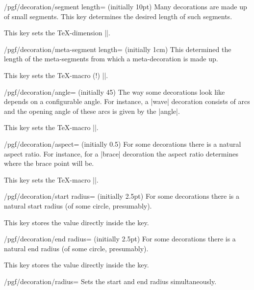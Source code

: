 \begin{key}{/pgf/decoration/segment length= (initially 10pt)}
  Many decorations are made up of small segments. This key determines
  the desired length of such segments.

  This key sets the \TeX-dimension |\pgfdecorationsegmentlength|.
\end{key}

\begin{key}{/pgf/decoration/meta-segment length= (initially 1cm)}
  This determined the length of the meta-segments from which a
  meta-decoration is made up.

  This key sets the \TeX-macro (!) |\pgfmetadecorationsegmentlength|.
\end{key}

\begin{key}{/pgf/decoration/angle= (initially 45)}
  The way some decorations look like depends on a configurable angle. For
  instance, a |wave| decoration consists of arcs and the opening angle
  of these arcs is given by the |angle|.

  This key sets the \TeX-macro |\pgfdecorationsegmentangle|.
\end{key}

\begin{key}{/pgf/decoration/aspect= (initially 0.5)}
  For some decorations there is a natural aspect ratio. For instance,
  for a |brace| decoration the aspect ratio determines where the brace
  point will be.

  This key sets the \TeX-macro |\pgfdecorationsegmentaspect|.
\end{key}

\begin{key}{/pgf/decoration/start radius= (initially 2.5pt)}
  For some decorations there is a natural start radius (of some circle, presumably).

  This key stores the value directly inside the key.
\end{key}

\begin{key}{/pgf/decoration/end radius= (initially 2.5pt)}
  For some decorations there is a natural end radius (of some circle, presumably).

  This key stores the value directly inside the key.
\end{key}

\begin{stylekey}{/pgf/decoration/radius=}
  Sets the start and end radius simultaneously.
\end{stylekey}


